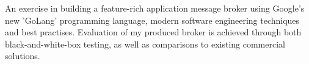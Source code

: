 An exercise in building a feature-rich application message broker using Google's
new 'GoLang' programming language, modern software engineering techniques and
best practises. Evaluation of my produced broker is achieved through both
black-and-white-box testing, as well as comparisons to existing commercial
solutions.

